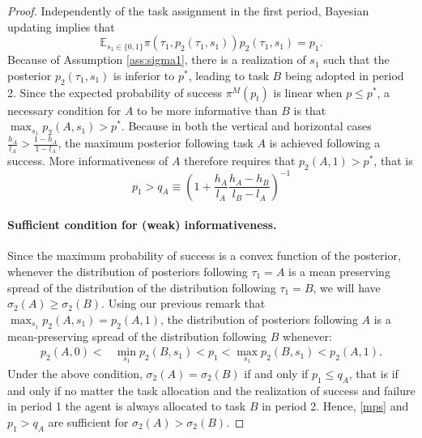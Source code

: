 \documentclass[12pt,american]{paper}
\theoremstyle{remark}
\begin{document}
\begin{proof}

Independently of the task assignment in the first period, Bayesian updating implies that 
\begin{equation}\label{mean}
\mathbb E_{s_1\in\{0,1\}}\pi (\tau_1,p_2(\tau_1,s_1)) p_2(\tau_1,s_1)=p_1.
\end{equation}
Because of Assumption \ref{ass:sigma1}, there is a realization of $s_1$ such that the posterior $p_2(\tau_1,s_1)$ is inferior to $p^*$, leading to  task $B$ being adopted in period 2. Since the expected probability of success $\pi^M(p_t)$ is linear when $p\leq p^*$, a necessary condition for $A$ to be more informative than $B$ is that $\max_{s_1}p_2(A,s_1)>p^*$.  Because in both the vertical and horizontal cases $\frac{h_A}{l_A}>\frac{1-h_A}{1-l_A}$, the maximum posterior following task $A$ is achieved following a success. More informativeness of $A$ therefore requires that $p_2(A,1)>p^*$, that is
\begin{equation}\label{q}
p_1 > q_A\equiv  \left(1+\frac{h_A}{l_A}\frac{h_A-h_B}{l_B-l_A}\right)^{-1}
\end{equation}
%
\paragraph{Sufficient condition for (weak) informativeness.} %

Since the maximum probability of success is a convex function of the posterior, whenever the distribution of posteriors following $\tau_1=A$ is a mean preserving spread of the distribution of the distribution following $\tau_1=B$, we will have $\sigma_2(A)\geq \sigma_2(B)$. Using our previous remark that $\max_{s_1}p_2(A,s_1)=p_2(A,1)$, the distribution of posteriors following $A$ is a mean-preserving spread of the distribution following $B$ whenever:
\begin{align}\label{mps}
p_2(A,0) < &\min_{s_1}p_2(B,s_1)<p_1<\max_{s_1}p_2(B,s_1) < p_2(A,1). \tag{MPS}
\end{align}
Under the above condition, $\sigma_2(A) = \sigma_2(B)$ if and only if $p_1\leq q_A$, that is if and only if no matter the task allocation and the realization of success and failure in period 1 the agent is always allocated to task $B$ in period 2. Hence, \eqref{mps} and $p_1> q_A$ are sufficient for  $\sigma_2(A) > \sigma_2(B)$.


\end{proof}
\end{document}
